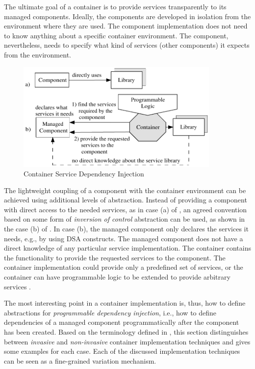 The ultimate goal of a container is to provide services transparently to its managed components. Ideally, the components are developed in isolation from the environment \cite{lorenz.96,ea.05} where they are used. The component implementation does not need to know anything about a specific container environment. The component, nevertheless, needs to specify what kind of services (other components) it expects from the environment.


\begin{figure}[ht]
	\begin{center}
		\includegraphics[width=10cm,height=!]{ch02/ioc}
	\end{center}
	\caption{Container Service Dependency Injection}
	\label{fig:con-inject}
\end{figure}

The lightweight coupling of a component with the container environment can be achieved using additional levels of abstraction. Instead of providing a component with direct access to the needed services, as in case (a) of , an agreed convention based on some form of \textit{inversion of control} \cite{fowler.ioc.04} abstraction can be used, as shown in the case (b) of . In case (b), the managed component only declares the services it needs, e.g., by using DSA constructs. The managed component does not have a direct knowledge of any particular service implementation. The container contains the functionality to provide the requested services to the component. The container implementation could provide only a predefined set of services, or the container can have programmable logic to be extended to provide arbitrary services .

The most interesting point in a container implementation is, thus, how to define abstractions for \textit{programmable dependency injection}, i.e., how to define dependencies of a managed component programmatically after the component has been created. Based on the terminology defined in \cite{java.compost}, this section distinguishes between \textit{invasive} and \textit{non-invasive} container implementation techniques and gives some examples for each case. Each of the discussed implementation techniques can be seen as a fine-grained variation mechanism.

